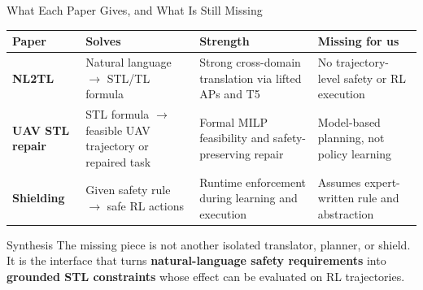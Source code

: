 \documentclass[aspectratio=169]{beamer}
\newcommand{\paper}[1]{\textcolor{HermesOrange!90!black}{\textbf{#1}}}
\begin{document}
\begin{frame}{What Each Paper Gives, and What Is Still Missing}
\footnotesize
\renewcommand{\arraystretch}{1.18}
\setlength{\tabcolsep}{3pt}
\begin{tabular}{L{0.19\textwidth} L{0.24\textwidth} L{0.25\textwidth} L{0.23\textwidth}}
\toprule
\textbf{Paper} & \textbf{Solves} & \textbf{Strength} & \textbf{Missing for us} \\
\midrule
\paper{NL2TL} & Natural language \(\to\) STL/TL formula & Strong cross-domain translation via lifted APs and T5 & No trajectory-level safety or RL execution \\
\paper{UAV STL repair} & STL formula \(\to\) feasible UAV trajectory or repaired task & Formal MILP feasibility and safety-preserving repair & Model-based planning, not policy learning \\
\paper{Shielding} & Given safety rule \(\to\) safe RL actions & Runtime enforcement during learning and execution & Assumes expert-written rule and abstraction \\
\bottomrule
\end{tabular}

\vspace{0.8em}
\begin{block}{Synthesis}
\footnotesize
The missing piece is not another isolated translator, planner, or shield. It is the interface that turns \textbf{natural-language safety requirements} into \textbf{grounded STL constraints} whose effect can be evaluated on RL trajectories.
\end{block}
\end{frame}
\end{document}

